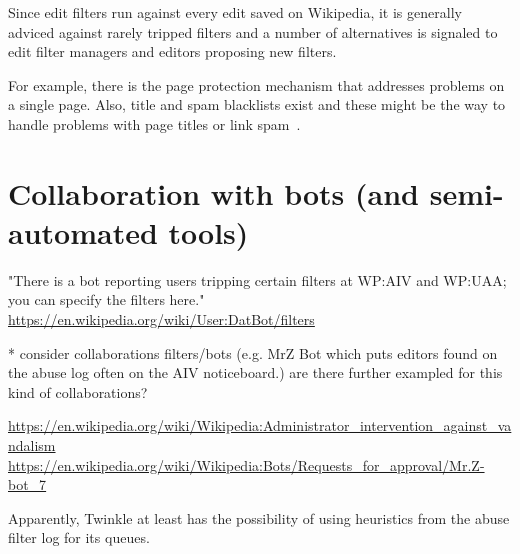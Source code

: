 Since edit filters run against every edit saved on Wikipedia, it is generally adviced against rarely tripped filters and a number of alternatives is signaled to edit filter managers and editors proposing new filters.

For example, there is the page protection mechanism that addresses problems on a single page.
Also, title and spam blacklists exist and these might be the way to handle problems with page titles or link spam~\cite{Wikipedia:EditFilter}.


\section{Collaboration with bots (and semi-automated tools)}

"There is a bot reporting users tripping certain filters at WP:AIV and WP:UAA; you can specify the filters here."
\url{https://en.wikipedia.org/wiki/User:DatBot/filters}

* consider collaborations filters/bots (e.g. MrZ Bot which puts editors found on the abuse log often on the AIV noticeboard.) are there further exampled for this kind of collaborations?

\url{https://en.wikipedia.org/wiki/Wikipedia:Administrator_intervention_against_vandalism}
\url{https://en.wikipedia.org/wiki/Wikipedia:Bots/Requests_for_approval/Mr.Z-bot_7}

Apparently, Twinkle at least has the possibility of using heuristics from the abuse filter log for its queues.

